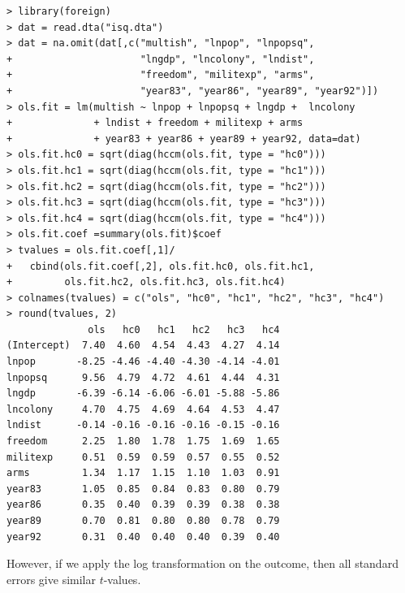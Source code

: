 \begin{lstlisting}
> library(foreign)
> dat = read.dta("isq.dta")
> dat = na.omit(dat[,c("multish", "lnpop", "lnpopsq", 
+                      "lngdp", "lncolony", "lndist", 
+                      "freedom", "militexp", "arms", 
+                      "year83", "year86", "year89", "year92")])
> ols.fit = lm(multish ~ lnpop + lnpopsq + lngdp +  lncolony 
+              + lndist + freedom + militexp + arms 
+              + year83 + year86 + year89 + year92, data=dat)
> ols.fit.hc0 = sqrt(diag(hccm(ols.fit, type = "hc0")))
> ols.fit.hc1 = sqrt(diag(hccm(ols.fit, type = "hc1")))
> ols.fit.hc2 = sqrt(diag(hccm(ols.fit, type = "hc2")))
> ols.fit.hc3 = sqrt(diag(hccm(ols.fit, type = "hc3")))
> ols.fit.hc4 = sqrt(diag(hccm(ols.fit, type = "hc4")))
> ols.fit.coef =summary(ols.fit)$coef
> tvalues = ols.fit.coef[,1]/
+   cbind(ols.fit.coef[,2], ols.fit.hc0, ols.fit.hc1, 
+         ols.fit.hc2, ols.fit.hc3, ols.fit.hc4)
> colnames(tvalues) = c("ols", "hc0", "hc1", "hc2", "hc3", "hc4")
> round(tvalues, 2)
              ols   hc0   hc1   hc2   hc3   hc4
(Intercept)  7.40  4.60  4.54  4.43  4.27  4.14
lnpop       -8.25 -4.46 -4.40 -4.30 -4.14 -4.01
lnpopsq      9.56  4.79  4.72  4.61  4.44  4.31
lngdp       -6.39 -6.14 -6.06 -6.01 -5.88 -5.86
lncolony     4.70  4.75  4.69  4.64  4.53  4.47
lndist      -0.14 -0.16 -0.16 -0.16 -0.15 -0.16
freedom      2.25  1.80  1.78  1.75  1.69  1.65
militexp     0.51  0.59  0.59  0.57  0.55  0.52
arms         1.34  1.17  1.15  1.10  1.03  0.91
year83       1.05  0.85  0.84  0.83  0.80  0.79
year86       0.35  0.40  0.39  0.39  0.38  0.38
year89       0.70  0.81  0.80  0.80  0.78  0.79
year92       0.31  0.40  0.40  0.40  0.39  0.40
\end{lstlisting}

However, if we apply the log transformation on the outcome, then all standard errors give similar $t$-values. 

